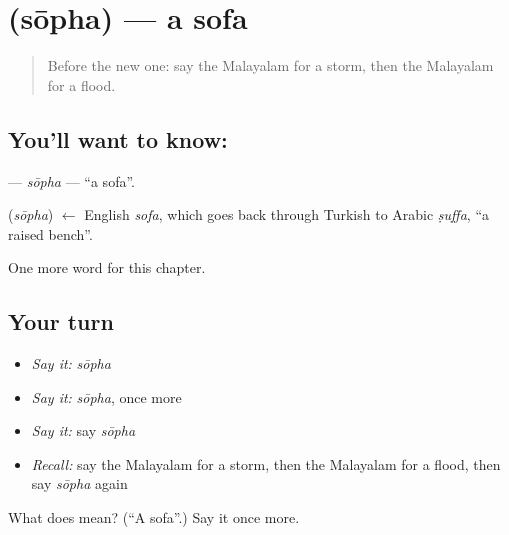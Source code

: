 \section[\texorpdfstring{\ml{സോഫ} (sōpha)}{സോഫ (sōpha)}]{ (sōpha) — a sofa}

\label{lesson:ML-C292-sopha}



\begin{quote}
Before the new one: say the Malayalam for a storm, then the Malayalam for a flood.
\end{quote}

\subsection*{You'll want to know: }
\textbf{} — \emph{sōpha} — \textquotedblleft{}a sofa\textquotedblright{}.

\begin{cousinweb}
\textbf{} (\emph{sōpha}) $\leftarrow$ English \emph{sofa}, which goes back through Turkish to Arabic \emph{ṣuffa}, \textquotedblleft{}a raised bench\textquotedblright{}.
\end{cousinweb}

\begin{grammarlens}[title={What you've built}]
One more word for this chapter.
\end{grammarlens}

\subsection*{Your turn}
\begin{itemize}
\raggedright
  \item \emph{Say it:} \emph{sōpha}
  \item \emph{Say it:} \emph{sōpha}, once more
  \item \emph{Say it:} say \emph{sōpha}
  \item \emph{Recall:} say the Malayalam for a storm, then the Malayalam for a flood, then say \emph{sōpha} again
\end{itemize}

\begin{tcolorbox}[breakable,colback=teal!4,colframe=teal!35!black,title={Before you move on}]
What does  mean? (\textquotedblleft{}A sofa\textquotedblright{}.) Say it once more.
\end{tcolorbox}
